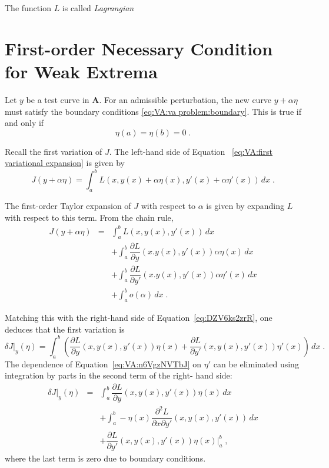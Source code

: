 The function $L$ is called \emph{Lagrangian}

\section{First-order Necessary Condition for Weak Extrema}

Let $y$ be a test curve in $\mathbf{A}$. For an admissible perturbation,
the new curve $y+\alpha\eta$ must satisfy the boundary conditions 
\eqref{eq:VA:va problem:boundary}. This is true if and only if
\[\eta(a)=\eta(b)=0\;.\]

Recall the first variation of $J$. The left-hand side of Equation~
\eqref{eq:VA:first variational expansion} is given by
\begin{equation}\label{eq:DZV6ks2zrR}
J(y+\alpha\eta)=\int_a^bL(x, y(x)+\alpha\eta(x),y'(x)+\alpha\eta'(x))
\,dx\;.
\end{equation}

The first-order Taylor expansion of $J$ with respect to $\alpha$ is 
given by expanding $L$ with respect to this term. From the chain rule,
\begin{equation*}
	\begin{array}{rcl}
		J(y+\alpha\eta)&=&\displaystyle\int_a^b L(x, y(x), y'(x))\,dx\\
		&&+\displaystyle\int_a^b\dfrac{\partial L}{\partial y}(x. y(x),y'(x))\alpha\eta(x)\,dx\\
		&&+\displaystyle\int_a^b\dfrac{\partial L}{\partial y'}(x. y(x),y'(x))\alpha\eta'(x)\,dx\\
		&&+\displaystyle\int_a^b o(\alpha)\,dx\;.
	\end{array}
\end{equation*}

Matching this with the right-hand side of Equation~\eqref{eq:DZV6ks2zrR},
one deduces that the first variation is
\begin{equation}\label{eq:VA:n6VgzNVTbJ}
	\delta J|_y(\eta)=\int_a^b\left(\dfrac{\partial L}{\partial y}(x,
	y(x),y'(x))\eta(x) + \dfrac{\partial L}{\partial y'}(x,
	y(x),y'(x))\eta'(x)\right)\, dx\;.
\end{equation}
The dependence of Equation~\eqref{eq:VA:n6VgzNVTbJ} on $\eta'$ can be
eliminated using integration by parts in the second term of the right-
hand side:
\begin{equation}
	\begin{array}{rcl}
	\delta J|_y(\eta)&=&\displaystyle\int_a^b\dfrac{\partial L}{\partial y}(x,
	y(x),y'(x))\eta(x)\,dx\\
	&&+\displaystyle\int_a^b - \eta(x)\dfrac{\partial^2 L}{\partial x\partial y'}(x,
	y(x),y'(x))\, dx\\
	&&+\dfrac{\partial L}{\partial y'}(x, y(x), y'(x))\eta(x)|_a^b\;,
	\end{array}
\end{equation}
where the last term is zero due to boundary conditions.

